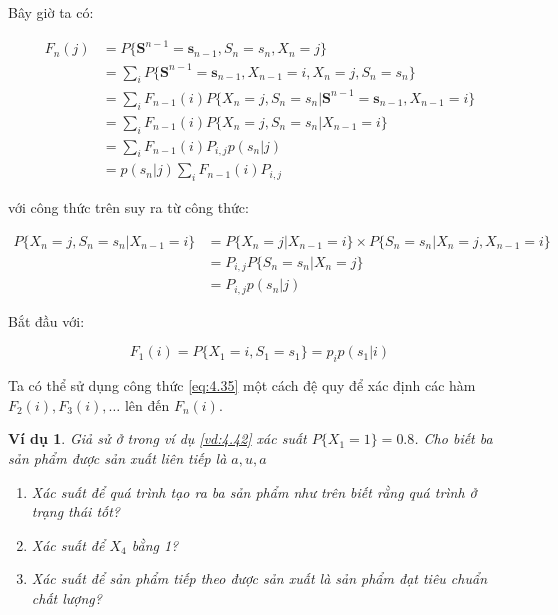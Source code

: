 \documentclass[14pt, a4paper]{article}
\numberwithin{equation}{section}
\numberwithin{figure}{section}
\theoremstyle{sltheorem}
\newtheorem{vd}{Ví dụ}
\theoremstyle{soltheorem}
\numberwithin{dl}{section}
\numberwithin{md}{section}
\numberwithin{vd}{section}
\begin{document}
    Bây giờ ta có:

    \begin{equation} \label{eq:4.35}
        \begin{aligned}
            F_n(j) & =P \lbrace \mathbf{S}^{n-1}=\mathbf{s}_{n-1}, S_n=s_n, X_n=j \rbrace \\
            & =\sum_i P \lbrace \mathbf{S}^{n-1}=\mathbf{s}_{n-1}, X_{n-1}=i, X_n=j, S_n=s_n \rbrace \\
            & =\sum_i F_{n-1}(i) P \lbrace X_n=j, S_n=s_n \vert \mathbf{S}^{n-1}=\mathbf{s}_{n-1}, X_{n-1}=i \rbrace \\
            & =\sum_i F_{n-1}(i) P \lbrace X_n=j, S_n=s_n \vert X_{n-1}=i \rbrace \\
            & =\sum_i F_{n-1}(i) P_{i, j} p(s_n \vert j) \\
            & =p(s_n \vert j) \sum_i F_{n-1}(i) P_{i, j}
            \end{aligned}
    \end{equation}

    với công thức trên suy ra từ công thức:

    \begin{equation*}
        \begin{aligned}
            P \lbrace X_n = j, S_n = s_n \vert X_{n-1} = i \rbrace &= P \lbrace X_n = j \vert X_{n-1} = i \rbrace \times P \lbrace S_n = s_n \vert X_n = j, X_{n-1} = i \rbrace \\
            &= P_{i, j} P \lbrace S_n = s_n \vert X_n = j \rbrace \\
            &= P_{i, j} p (s_n \vert j)
        \end{aligned}        
    \end{equation*}

    Bắt đầu với:

    \begin{equation*}
        F_1(i) = P \lbrace X_1 = i, S_1 = s_1 \rbrace = p_i p(s_1 \vert i)
    \end{equation*}

    Ta có thể sử dụng công thức \ref{eq:4.35} một cách đệ quy để xác định các hàm $F_2(i), F_3(i), \dots$ lên đến $F_n(i)$.

    \begin{vd}
        Giả sử ở trong ví dụ \ref{vd:4.42} xác suất $P \lbrace X_1 = 1 \rbrace = 0.8$.
        Cho biết ba sản phẩm được sản xuất liên tiếp là $a, u, a$

        \begin{enumerate}[label=(\alph*)]
            \item Xác suất để quá trình tạo ra ba sản phẩm như trên biết rằng quá trình ở trạng thái tốt?
            \item Xác suất để $X_4$ bằng 1?
            \item Xác suất để sản phẩm tiếp theo được sản xuất là sản phẩm đạt tiêu chuẩn chất lượng?
        \end{enumerate}
    \end{vd}
\end{document}
